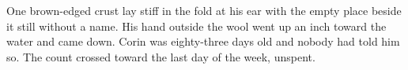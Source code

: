 One brown-edged crust lay stiff in the fold at his ear with the empty place beside it still without a name. His hand outside the wool went up an inch toward the water and came down. Corin was eighty-three days old and nobody had told him so. The count crossed toward the last day of the week, unspent.
